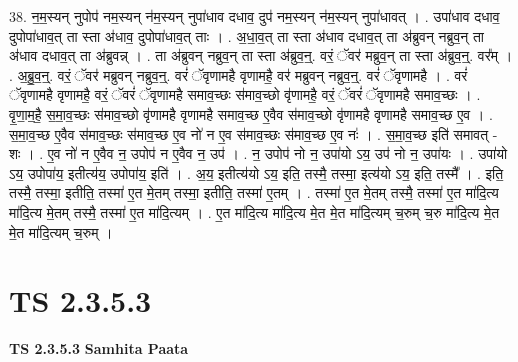 \documentclass[17pt]{extarticle}
\begin{document}
38. न॒म॒स्यन् नुपोप॑ नम॒स्यन् न॑म॒स्यन् नुपा॑धाव दधाव॒ दुप॑ नम॒स्यन् न॑म॒स्यन् नुपा॑धावत् । . उपा॑धाव दधाव॒ दुपोपा॑धाव॒त् ता स्ता अ॑धाव॒ दुपोपा॑धाव॒त् ताः । . अ॒धा॒व॒त् ता स्ता अ॑धाव दधाव॒त् ता अ॑ब्रुवन् नब्रुव॒न् ता अ॑धाव दधाव॒त् ता अ॑ब्रुवन्न् । . ता अ॑ब्रुवन् नब्रुव॒न् ता स्ता अ॑ब्रुव॒न्॒. वरं॒ ॅवर॑ मब्रुव॒न् ता स्ता अ॑ब्रुव॒न्॒. वर᳚म् । . अ॒ब्रु॒व॒न्॒. वरं॒ ॅवर॑ मब्रुवन् नब्रुव॒न्॒. वरं॑ ॅवृणामहै वृणामहै॒ वर॑ मब्रुवन् नब्रुव॒न्॒. वरं॑ ॅवृणामहै । . वरं॑ ॅवृणामहै वृणामहै॒ वरं॒ ॅवरं॑ ॅवृणामहै समाव॒च्छः स॑माव॒च्छो वृ॑णामहै॒ वरं॒ ॅवरं॑ ॅवृणामहै समाव॒च्छः । . वृ॒णा॒म॒है॒ स॒मा॒व॒च्छः स॑माव॒च्छो वृ॑णामहै वृणामहै समाव॒च्छ ए॒वैव स॑माव॒च्छो वृ॑णामहै वृणामहै समाव॒च्छ ए॒व । . स॒मा॒व॒च्छ ए॒वैव स॑माव॒च्छः स॑माव॒च्छ ए॒व नो॑ न ए॒व स॑माव॒च्छः स॑माव॒च्छ ए॒व नः॑ । . स॒मा॒व॒च्छ इति॑ समावत् - शः । . ए॒व नो॑ न ए॒वैव न॒ उपोप॑ न ए॒वैव न॒ उप॑ । . न॒ उपोप॑ नो न॒ उपा॑यो ऽय॒ उप॑ नो न॒ उपा॑यः । . उपा॑यो ऽय॒ उपोपा॑य॒ इतीत्य॑य॒ उपोपा॑य॒ इति॑ । . अ॒य॒ इतीत्य॑यो ऽय॒ इति॒ तस्मै॒ तस्मा॒ इत्य॑यो ऽय॒ इति॒ तस्मै᳚ । . इति॒ तस्मै॒ तस्मा॒ इतीति॒ तस्मा॑ ए॒त मे॒तम् तस्मा॒ इतीति॒ तस्मा॑ ए॒तम् । . तस्मा॑ ए॒त मे॒तम् तस्मै॒ तस्मा॑ ए॒त मा॑दि॒त्य मा॑दि॒त्य मे॒तम् तस्मै॒ तस्मा॑ ए॒त मा॑दि॒त्यम् । . ए॒त मा॑दि॒त्य मा॑दि॒त्य मे॒त मे॒त मा॑दि॒त्यम् च॒रुम् च॒रु मा॑दि॒त्य मे॒त मे॒त मा॑दि॒त्यम् च॒रुम् । \newline
\pagebreak
{}
\section*{ TS 2.3.5.3 }

\textbf{TS 2.3.5.3 } \newline
\textbf{Samhita Paata} \newline
\end{document}
